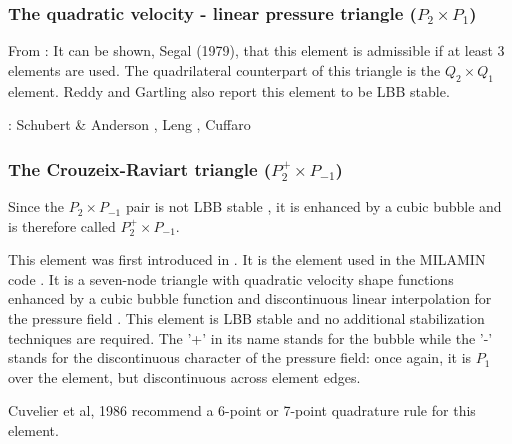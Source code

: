 \subsubsection{The quadratic velocity - linear pressure triangle ($P_2\times P_1$)}
\label{ss:p2p1}

From \cite{segal}: 
It can be shown, Segal (1979), that this element is admissible if at least 3 elements 
are used. The quadrilateral counterpart of this triangle is the $Q_2\times Q_1$ element.
Reddy and Gartling \cite[p179]{reddybook2} also report this element to be LBB stable.

\Literature: Schubert \& Anderson \cite{scan85}, Leng \etal \cite{lejx14}, Cuffaro \etal \cite{cump20}


\subsubsection{The Crouzeix-Raviart triangle ($P_2^+\times P_{-1}$)}
\label{sec:crouzeix-raviart}

Since the $P_2\times P_{-1}$ pair is not LBB stable \cite[p179]{reddybook2}, 
it is enhanced by a cubic bubble and is therefore called $P_2^+\times P_{-1}$. 

This element was first introduced in \cite{crra73}.
It is the element used in the MILAMIN code \cite{daks08}.
It is a seven-node triangle with quadratic velocity shape 
functions enhanced by a cubic bubble function and discontinuous linear interpolation for 
the pressure field \cite{cuss86}. 
This element is LBB stable and no additional stabilization techniques are required\cite{elsw}.
The '+' in its name stands for the bubble while the '-' stands for the discontinuous
character of the pressure field: once again, it is $P_1$ over the element, but discontinuous
across element edges.

\begin{remark}
Cuvelier et al, 1986 \cite{cuss86} recommend a 6-point or 7-point quadrature rule for this element.
\end{remark}

